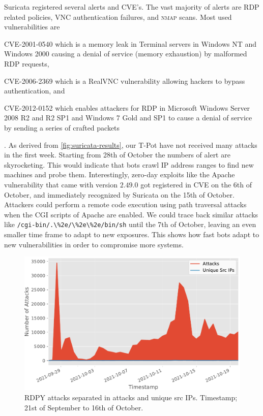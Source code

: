 Suricata registered several alerts and CVE's.
The vast majority of alerts are RDP related policies, VNC authentication failures, and \textsc{nmap} scans.
Most used vulnerabilities are
\begin{enumerate*}[label=(\roman*)]
    \item CVE-2001-0540\cite{CVE-2001-0540} which is a memory leak in Terminal servers in Windows NT and Windows 2000 causing a denial of service (memory exhaustion) by malformed RDP requests,
    \item CVE-2006-2369\cite{CVE-2006-2369} which is a RealVNC vulnerability allowing hackers to bypass authentication, and
    \item CVE-2012-0152\cite{CVE-2012-0152} which enables attackers for RDP in Microsoft Windows Server 2008 R2 and R2 SP1 and Windows 7 Gold and SP1 to cause a denial of service by sending a series of crafted packets
\end{enumerate*}.
As derived from \autoref{fig:suricata-results}, our T-Pot have not received many attacks in the first week.
Starting from 28th of October the numbers of alert are skyrocketing.
This would indicate that bots crawl IP address ranges to find new machines and probe them.
Interestingly, zero-day exploits like the Apache vulnerability \cite{CVE-2021-42013} that came with version $2.49.0$ got registered in CVE on the 6th of October, and immediately recognized by Suricata on the 15th of October.
Attackers could perform a remote code execution using path traversal attacks when the CGI scripts of Apache are enabled.
We could trace back similar attacks like \verb|/cgi-bin/.\%2e/\%2e\%2e/bin/sh| until the 7th of October, leaving an even smaller time frame to adapt to new exposures.
This shows how fast bots adapt to new vulnerabilities in order to compromise more systems.

\begin{figure}[ht]
    \centering
    \includegraphics[width=\textwidth]{figures/tpot-rdpy-port.pdf}
    \caption[RDPY results of T-Pot]{RDPY attacks separated in attacks and unique src IPs. Timestamp; 21st of September to 16th of October.}
    \label{fig:rdpy-results}
\end{figure}

